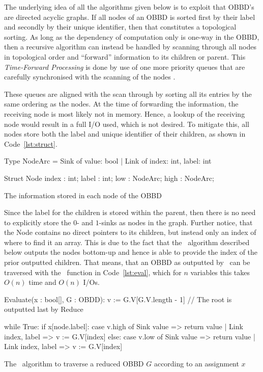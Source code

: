 The underlying idea of all the algorithms given below is to exploit that OBBD's
are directed acyclic graphs. If all nodes of an OBBD is sorted first by their
label and secondly by their unique identifier, then that constitutes a
topological sorting. As long as the dependency of computation only is one-way in
the OBBD, then a recursive algorithm can instead be handled by scanning through
all nodes in topological order and ``forward'' information to its children or
parent. This \emph{Time-Forward Processing} is done by use of one more priority
queues that are carefully synchronised with the scanning of the nodes \todocite.

These queues are aligned with the scan through by sorting all its entries by the
same ordering as the nodes. At the time of forwarding the information, the
receiving node is most likely not in memory. Hence, a lookup of the receiving
node would result in a full I/O used, which is not desired. To mitigate this,
all nodes store both the label and unique identifier of their children, as shown
in Code~\ref{lst:struct}.
\begin{lstfloat}
  \centering

  \begin{blstlisting}[language=pseudo, numbers=none]
  Type NodeArc = Sink of { value: bool }
               | Link of { index: int, label: int }

  Struct Node {
    index : int;
    label : int;
    low   : NodeArc;
    high  : NodeArc;
  }
  \end{blstlisting}

  \caption{The information stored in each node of the OBBD}
  \label{lst:struct}
\end{lstfloat}

Since the label for the children is stored within the parent, then there is no
need to explicitly store the $0$- and $1$-sinks as nodes in the graph. Further
notice, that the Node contains no direct pointers to its children, but instead
only an index of where to find it an array. This is due to the fact that the
\Reduce\ algorithm described below outputs the nodes bottom-up and hence is able
to provide the index of the prior outputted children. That means, that an OBBD
as outputted by \Reduce\ can be traversed with the \Evaluate\ function in
Code~\ref{lst:eval}, which for $n$ variables this takes $O(n)$ time and $O(n)$
I/Os.
\begin{lstfloat}
  \centering

  \begin{blstlisting}
  Evaluate(x : bool[], G : OBDD):
    v := G.V[G.V.length - 1] // The root is outputted last by Reduce

    while True:
      if x[node.label]:
        case v.high of Sink{ value }        => return value
                     | Link{ index, label } => v := G.V[index]
      else:
        case v.low of Sink{ value }        => return value
                    | Link{ index, label } => v := G.V[index]
  \end{blstlisting}

  \caption{The \Evaluate\ algorithm to traverse a reduced OBBD $G$ according to an
    assignment $x$}
  \label{lst:eval}
\end{lstfloat}

